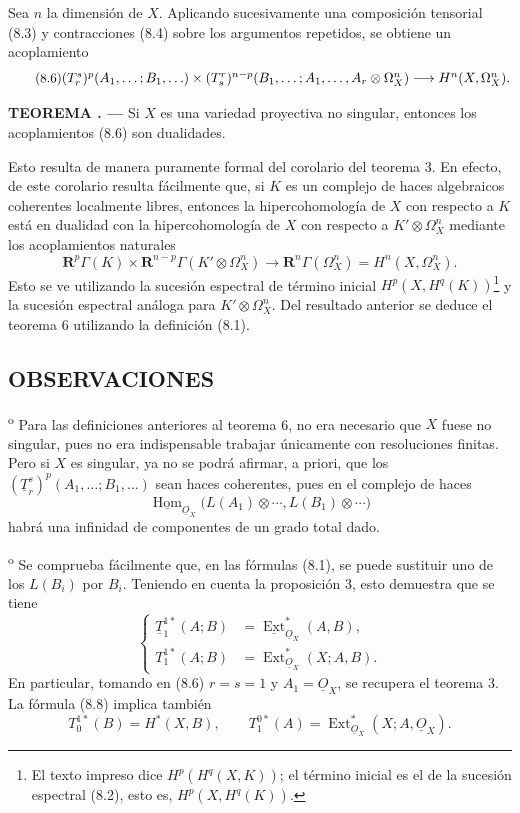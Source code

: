 \documentclass[11pt,twoside,openany]{book}
\numberwithin{equation}{section}
\newcommand{\src}[1]{%
  \phantomsection\hypertarget{src:#1}{}%
  \marginpar{\raggedleft\footnotesize\sffamily #1}%
}
\newcommand{\Osh}{\underline{O}}
\newcommand{\Homsh}{\underline{\operatorname{Hom}}}
\newcommand{\Extsh}{\underline{\operatorname{Ext}}}
\theoremstyle{plain}
\theoremstyle{definition}
\theoremstyle{remark}
\newcommand{\result}[2]{%
  \par\medskip\noindent\textbf{#1%
  \if\relax\detokenize{#2}\relax\else\space#2\fi. ---}\enspace
}
\newcommand{\FgaUnitKey}{frontmatter}
\renewcommand{\src}[1]{%
  \phantomsection\hypertarget{src:\FgaUnitKey:#1}{}%
  \marginpar{\raggedleft\footnotesize\sffamily #1}%
}
\theoremstyle{plain}
\theoremstyle{definition}
\theoremstyle{remark}
\begin{document}
Sea $n$ la dimensión de $X$. Aplicando sucesivamente una composición
tensorial (8.3) y contracciones (8.4) sobre los argumentos repetidos, se
obtiene un acoplamiento
\begin{equation}\tag{8.6}
\resizebox{\textwidth}{!}{$
  (T_{r}^{s})^{p}(A_1,\ldots;B_1,\ldots)
  \times
  (T_{s}^{r})^{n-p}(B_1,\ldots;A_1,\ldots,A_r\otimes\Omega_X^{n})
  \longrightarrow H^{n}(X,\Omega_X^{n}).
$}
\end{equation}

\result{TEOREMA}{6} Si $X$ es una variedad proyectiva no singular, entonces
los acoplamientos (8.6) son dualidades.

Esto resulta de manera puramente formal del corolario del teorema 3. En efecto,
de este corolario resulta fácilmente que, si $K$ es un complejo de haces
algebraicos coherentes localmente libres, entonces la hipercohomología de $X$ con
respecto a $K$ está en dualidad con la hipercohomología de $X$ con respecto a
$K'\otimes\Omega_X^{n}$ mediante los acoplamientos naturales
\begin{equation}\tag{8.7}
  \mathbf R^{p}\Gamma(K)
  \times\mathbf R^{n-p}\Gamma(K'\otimes\Omega_X^{n})
  \longrightarrow\mathbf R^{n}\Gamma(\Omega_X^{n})
  =H^{n}(X,\Omega_X^{n}).
\end{equation}
Esto se ve utilizando la sucesión espectral de término inicial
$H^{p}(X,H^{q}(K))$\footnote{El texto impreso dice
$H^{p}(H^{q}(X,K))$; el término inicial es el de la sucesión espectral (8.2),
esto es, $H^{p}(X,H^{q}(K))$.} y la sucesión espectral análoga para
$K'\otimes\Omega_X^{n}$. Del resultado anterior se deduce el teorema 6
utilizando la definición (8.1).

\src{192}
\subsection*{OBSERVACIONES}

\textsuperscript{o} Para las definiciones anteriores al teorema 6,
no era necesario que $X$ fuese no singular, pues no era
indispensable trabajar únicamente con resoluciones finitas. Pero si $X$
es singular, ya no se podrá afirmar, a priori, que los
$(\underline{T}_{r}^{s})^{p}(A_1,\ldots;B_1,\ldots)$ sean haces
coherentes, pues en el complejo de haces
\[
  \Homsh_{\Osh_X}\bigl(L(A_1)\otimes\cdots,L(B_1)\otimes\cdots\bigr)
\]
habrá una infinidad de componentes de un grado total dado.

\medskip
{}\textsuperscript{o} Se comprueba fácilmente que, en las fórmulas
(8.1), se puede sustituir uno de los $L(B_i)$ por $B_i$. Teniendo en cuenta la
proposición 3, esto demuestra que se tiene
\begin{equation}\tag{8.8}
\left\{
\begin{aligned}
  \underline{T}_{1}^{1*}(A;B)&=\Extsh_{\Osh_X}^{*}(A,B),\\
  T_{1}^{1*}(A;B)&=\operatorname{Ext}_{\Osh_X}^{*}(X;A,B).
\end{aligned}
\right.
\end{equation}
En particular, tomando en (8.6) $r=s=1$ y $A_1=\Osh_X$, se recupera el
teorema 3. La fórmula (8.8) implica también
\[
  T_{0}^{1*}(B)=H^{*}(X,B),
  \qquad
  T_{1}^{0*}(A)=\operatorname{Ext}_{\Osh_X}^{*}(X;A,\Osh_X).
\]
\end{document}
